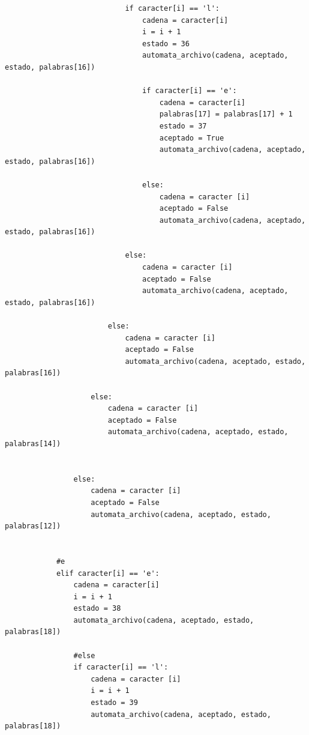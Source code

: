 \documentclass{article}
\begin{document}
\begin{flushleft}
\begin{lstlisting}
                            if caracter[i] == 'l':
                                cadena = caracter[i]
                                i = i + 1
                                estado = 36
                                automata_archivo(cadena, aceptado, estado, palabras[16])
                                
                                if caracter[i] == 'e':
                                    cadena = caracter[i]
                                    palabras[17] = palabras[17] + 1
                                    estado = 37
                                    aceptado = True
                                    automata_archivo(cadena, aceptado, estado, palabras[16])
                                    
                                else:
                                    cadena = caracter [i]
                                    aceptado = False
                                    automata_archivo(cadena, aceptado, estado, palabras[16])
                                    
                            else:
                                cadena = caracter [i]
                                aceptado = False
                                automata_archivo(cadena, aceptado, estado, palabras[16])
                                
                        else:
                            cadena = caracter [i]
                            aceptado = False
                            automata_archivo(cadena, aceptado, estado, palabras[16])
                            
                    else:
                        cadena = caracter [i]
                        aceptado = False
                        automata_archivo(cadena, aceptado, estado, palabras[14])
                
                
                else:
                    cadena = caracter [i]
                    aceptado = False
                    automata_archivo(cadena, aceptado, estado, palabras[12])
                    
            
            #e
            elif caracter[i] == 'e':
                cadena = caracter[i]
                i = i + 1
                estado = 38
                automata_archivo(cadena, aceptado, estado, palabras[18])
                
                #else
                if caracter[i] == 'l':
                    cadena = caracter [i]
                    i = i + 1
                    estado = 39
                    automata_archivo(cadena, aceptado, estado, palabras[18])   
                    

\end{lstlisting}
\end{flushleft}
\end{document}

